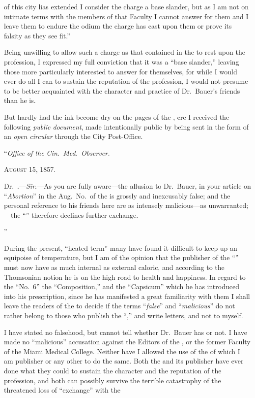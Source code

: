 of this city lias extended I consider the charge a base slander, but as I
am not on intimate terms with the members of that Faculty I cannot
answer for them and I leave them to endure the odium the charge has
cast upon them or prove its falsity as they see fit.''

Being unwilling to allow such a charge as that contained in the
 to rest upon the profession, I expressed my full conviction
that it was a ``base slander,'' leaving those more particularly interested
to answer for themselves, for while I would ever do all I can to sustain
the reputation of the profession, I would not presume to be better
acquainted with the character and practice of Dr.~Bauer's friends
than he is.

But hardly had the ink become dry on the pages of the , ere
I received the following \emph{public document}, made intentionally public by
being sent in the form of an \emph{open circular} through the City Post-Office.

\hfill{}``\emph{Office of the Cin.\ Med.\ Observer.}\quad

\hfill{}\textsc{August 15, 1857.}\quad

Dr.~.---\emph{Sir}.---As you are fully aware---the allusion to
Dr.~Bauer, in your article on ``\emph{Abortion}'' in the Aug.\ No.\ of the
 is grossly and inexcusably false; and the personal
reference to his friends here are as intensely malicious---as unwarranted;---the
``'' therefore declines further exchange.

\hfill{}''\quad

During the present, ``heated term'' many have found it difficult to
keep up an equipoise of temperature, but I am of the opinion that the
publisher of the ``'' must now have as much internal as
external caloric, and according to the Thomsonian notion he is on
the high road to health and happiness. In regard to the ``No.~6'' the
``Composition,'' and the ``Capsicum'' which he has introduced into
his prescription, since he has manifested a great familiarity with them
I shall leave the readers of the  to decide if the terms ``\emph{false}''
and ``\emph{malicious}'' do not rather belong to those who publish the ``,''
and write letters, and not to myself.

I have stated no falsehood, but cannot tell whether Dr.~Bauer has
or not. I have made no ``malicious'' accusation against the Editors of
the , or the former Faculty of the Miami Medical College.
Neither have I allowed the use of the  of which I am publisher
or any other to do the same. Both the  and
its publisher have ever done what they could to sustain the character
and the reputation of the profession, and both can possibly survive
the terrible catastrophy of the threatened loss of ``exchange'' with the\endinput

